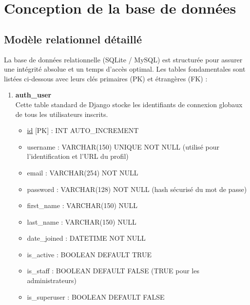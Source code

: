 \section{Conception de la base de données}

\subsection{Modèle relationnel détaillé}
La base de données relationnelle (SQLite / MySQL) est structurée pour assurer une intégrité absolue et un temps d'accès optimal. Les tables fondamentales sont listées ci-dessous avec leurs clés primaires (PK) et étrangères (FK) :

\begin{enumerate}
    \item \textbf{auth\_user} \\
    Cette table standard de Django stocke les identifiants de connexion globaux de tous les utilisateurs inscrits.
    \begin{itemize}
        \item \underline{id} [PK] : INT AUTO\_INCREMENT
        \item username : VARCHAR(150) UNIQUE NOT NULL (utilisé pour l'identification et l'URL du profil)
        \item email : VARCHAR(254) NOT NULL
        \item password : VARCHAR(128) NOT NULL (hash sécurisé du mot de passe)
        \item first\_name : VARCHAR(150) NULL
        \item last\_name : VARCHAR(150) NULL
        \item date\_joined : DATETIME NOT NULL
        \item is\_active : BOOLEAN DEFAULT TRUE
        \item is\_staff : BOOLEAN DEFAULT FALSE (TRUE pour les administrateurs)
        \item is\_superuser : BOOLEAN DEFAULT FALSE
    \end{itemize}


\end{enumerate}
